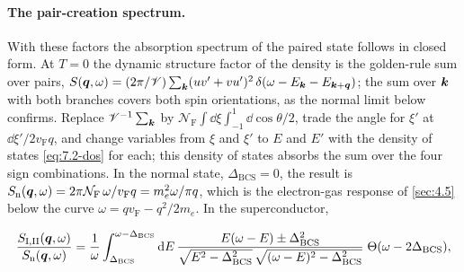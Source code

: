 \paragraph{The pair-creation spectrum.} With these factors the absorption spectrum of the paired state follows in closed form. At $T = 0$ the dynamic structure factor of the density is the golden-rule sum over pairs, $S(\bm{q},\omega) = (2\pi/\mathscr{V})\sum_{\bm{k}}(uv' + vu')^2\,\delta(\omega - E_{\bm{k}} - E_{\bm{k}+\bm{q}})$; the sum over $\bm{k}$ with both branches covers both spin orientations, as the normal limit below confirms. Replace $\mathscr{V}^{-1}\sum_{\bm{k}}$ by $\mathcal{N}_{\mathrm{F}}\int\dd\xi\int_{-1}^1\dd\!\cos\theta/2$, trade the angle for $\xi'$ at $\dd\xi'/2v_{\mathrm{F}}q$, and change variables from $\xi$ and $\xi'$ to $E$ and $E'$ with the density of states \cref{eq:7.2-dos} for each; this density of states absorbs the sum over the four sign combinations. In the normal state, $\Delta_{\mathrm{BCS}} = 0$, the result is $S_{\mathrm{n}}(\bm{q},\omega) = 2\pi\mathcal{N}_{\mathrm{F}}\,\omega/v_{\mathrm{F}}q = m_e^2\omega/\pi q$, which is the electron-gas response of \cref{sec:4.5} below the curve $\omega = qv_{\mathrm{F}} - q^2/2m_e$. In the superconductor,
\begin{keyresult}
\begin{equation}
  \frac{S_{\mathrm{I,II}}(\bm{q},\omega)}{S_{\mathrm{n}}(\bm{q},\omega)} = \frac{1}{\omega}\int_{\Delta_{\mathrm{BCS}}}^{\omega - \Delta_{\mathrm{BCS}}}\mathrm{d} E\,\frac{E(\omega - E) \pm \Delta_{\mathrm{BCS}}^2}{\sqrt{E^2 - \Delta_{\mathrm{BCS}}^2}\,\sqrt{(\omega - E)^2 - \Delta_{\mathrm{BCS}}^2}}\;\Theta(\omega - 2\Delta_{\mathrm{BCS}}) ,
  \label{eq:7.2-pairspec}
\end{equation}
\end{keyresult}
